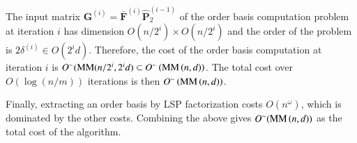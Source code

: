 \begin{pf}
The input matrix $\mathbf{G}^{\left(i\right)}=\bar{\mathbf{F}}^{\left(i\right)}\hat{\mathbf{P}}_{2}^{\left(i-1\right)}$
of the order basis computation problem at iteration $i$ has dimension
$O(n/2^{i})\times O(n/2^{i})$ and the order of the problem is $2\delta^{\left(i\right)}\in O(2^{i}d)$.
Therefore, the cost of the order basis computation at iteration $i$
is $O^{\sim}(\MM(n/2^{i},2^{i}d)\subset O^{\sim}\left(\MM\left(n,d\right)\right)$.
The total cost over $O(\log\left(n/m\right))$ iterations is then
$O^{\sim}\left(\MM\left(n,d\right)\right)$. %
\begin{comment}
not sure if this needs more explanation. 
\end{comment}
{}

Finally, extracting an order basis by LSP factorization costs $O\left(n^{\omega}\right)$,
which is dominated by the other costs. Combining the above gives $O^{\sim}(\MM\left(n,d\right))$
as the total cost of the algorithm. 
\end{pf}

